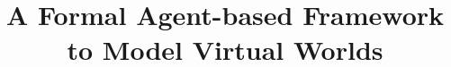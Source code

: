 \documentclass{aamas2012}
\begin{document}


\title{A Formal Agent-based Framework to Model Virtual Worlds}




%
%
%
%

%

\end{document}
